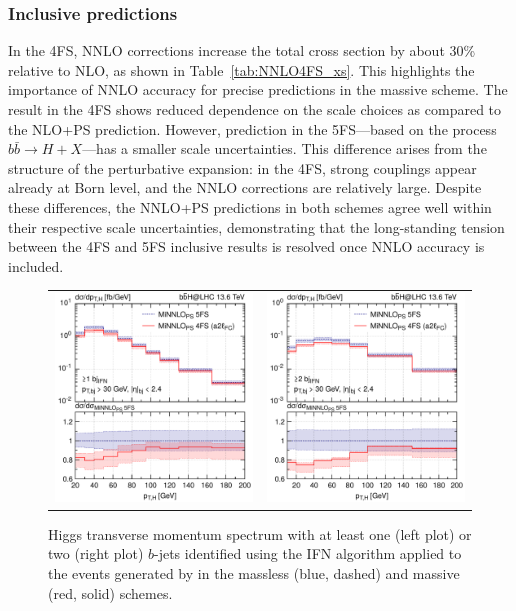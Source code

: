 \documentclass[11pt,a4paper]{article}
\begin{document}
\subsubsection*{Inclusive predictions}
In the 4FS, NNLO corrections increase the total cross section by about 30\% relative to NLO, as shown in Table~\ref{tab:NNLO4FS_xs}. This highlights the importance of NNLO accuracy for precise predictions in the massive scheme. The \minnlo{} result in the 4FS shows reduced dependence on the scale choices as compared to the NLO+PS prediction. However, \minnlo{} prediction in the 5FS—based on the process \(b\bar{b} \to H+X\)—has a smaller scale uncertainties. This difference arises from the structure of the perturbative expansion: in the 4FS, strong couplings appear already at Born level, and the NNLO corrections are relatively large. Despite these differences, the NNLO+PS predictions in both schemes agree well within their respective scale uncertainties, demonstrating that the long-standing tension between the 4FS and 5FS inclusive results is resolved once NNLO accuracy is included.
\begin{figure}[t!]
\begin{center}
\begin{tabular}{cc}
\includegraphics[width=.45\textwidth, page=1]{plots/4fs/pt_H-IFN-1bjet_minnlops-FC.pdf}&
\includegraphics[width=.45\textwidth, page=1]{plots/4fs/pt_H-IFN-2bjet_minnlops-FC.pdf}
\end{tabular}
\vspace*{1ex}
\caption{Higgs transverse momentum spectrum with at least one (left plot) or two (right plot) $b$-jets identified using the IFN algorithm applied to the events generated by \minnlo{} in the massless (blue, dashed) and massive (red, solid) schemes.\label{fig:4fsB}}
\end{center}
\end{figure}
\end{document}
